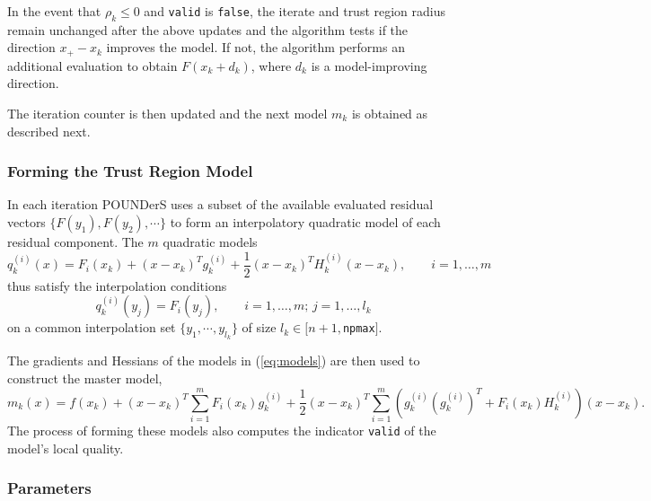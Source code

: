 In the event that $\rho_k\leq 0$ and \texttt{valid} is \texttt{false}, the
iterate and trust region radius remain unchanged after the above updates
and the algorithm tests if the direction $x_+-x_k$ improves the model. If
not, the algorithm performs an additional evaluation to obtain
$F(x_k+d_k)$, where $d_k$ is a model-improving direction. 

The iteration counter is then updated and the next model $m_{k}$ is
obtained as described next.

\subsubsection{Forming the Trust Region Model}
In each iteration POUNDerS uses a subset of the available evaluated
residual vectors $\{ F(y_1), F(y_2), \cdots \}$ to form an interpolatory
quadratic model of each residual component. The $m$ quadratic models
\begin{equation}
 q_k^{(i)}(x) = 
 F_i(x_k) + (x-x_k)^T g_k^{(i)} + \frac{1}{2} (x-x_k)^T H_k^{(i)} (x-x_k), 
 \qquad i = 1, \ldots, m
\label{eq:models}
\end{equation}
thus satisfy the interpolation conditions 
\[ 
 q_k^{(i)}(y_j) = F_i(y_j), \qquad i=1, \ldots, m; \, j=1,\ldots , l_k
\]
on a common interpolation set $\{y_1, \cdots , y_{l_k}\}$ of size
$l_k\in[n+1,$\texttt{npmax}$]$.

The gradients and Hessians of the models in (\ref{eq:models}) are then
used to construct the master model, 
\begin{equation}
m_k(x) = f(x_k) + 
(x-x_k)^T \sum_{i=1}^{m} F_i(x_k) g_k^{(i)} +
\frac{1}{2}(x-x_k)^T \sum_{i=1}^{m}
\left( g_k^{(i)} \left(g_k^{(i)}\right)^T +  F_i(x_k)
H_k^{(i)}\right) (x-x_k).
 \label{eq:newton2}
\end{equation}
The process of forming these models also computes the indicator
\texttt{valid} of the model's local quality.


\subsubsection{Parameters}
\begin{comment}
If evaluations of the residual vector $F$ are available, then this can be
input and will often result in improved performance. Assuming that
\texttt{nfs}$>0$ such points are available, then the user should input the
matrix of locations \texttt{X0} $=[y_1, \ldots, y_{\rm nfs}]$ and the
corresponding matrix of residuals \texttt{F0} $= [F(y_1), \ldots, F(y_{\rm
nfs})]$. The user selects which one of these points is the starting point
(this is typically the point $\arg \min_{i=1,\ldots, {\rm nfs}}
\|F(y_i)\|^2$) to be used and inputs the index as the integer
\texttt{xkin}.

If no such points are available, then \texttt{nfs}$=0$, \texttt{F0} is
empty, \texttt{xkin}$=1$, and the user inputs the desired starting point
(whose residual has not yet been evaluated) as \texttt{X0} $=[x_0]$.


In addition to the inputs \texttt{nfs}, \texttt{X0}, \texttt{F0},
\texttt{xkin} above, 
\end{comment}

